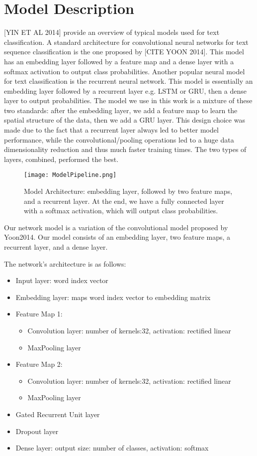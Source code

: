 \section{Model Description}

[YIN ET AL 2014] provide an overview of typical models used for text classification.
A standard architecture for convolutional neural networks for text sequence classification is the one proposed by
[CITE YOON 2014]. This model has an embedding layer followed by a feature map and a dense layer with a softmax activation
to output class probabilities.
Another popular neural model for text classification is the recurrent neural network. This model is
essentially an embedding layer followed by a recurrent layer e.g. LSTM or GRU, then a dense layer to output probabilities.
The model we use in this work is a mixture of these two standards: after the embedding layer, we add a feature map to learn the spatial
structure of the data, then we add a GRU layer. This design choice was made due to the fact that a recurrent layer
always led to better model performance, while the convolutional/pooling operations led to a huge data dimensionality reduction
and thus much faster training times. The two types of layers, combined, performed the best.


\begin{figure}[h]
\caption{Model Architecture: embedding layer, followed by two feature maps, and a recurrent layer. At the end, we have
a fully connected layer with a softmax activation, which will output class probabilities.}
\centering
\texttt{[image: ModelPipeline.png]}
\end{figure}

Our network model is a variation of the convolutional model proposed by Yoon2014.
Our model consists of an embedding layer, two feature maps, a recurrent layer, and a dense layer.

The network's architecture is as follows:
\begin{itemize}
  \item Input layer: word index vector
  \item Embedding layer: maps word index vector to embedding matrix
  \item Feature Map 1:
      \begin{itemize}
        \item Convolution layer: number of kernels:32, activation: rectified linear
        \item MaxPooling layer
      \end{itemize}
\item Feature Map 2:
    \begin{itemize}
      \item Convolution layer: number of kernels:32, activation: rectified linear
      \item MaxPooling layer
    \end{itemize}
\item Gated Recurrent Unit layer
\item Dropout layer
\item Dense layer: output size: number of classes, activation: softmax
\end{itemize}

